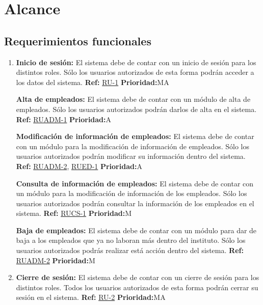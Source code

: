\section{Alcance}

\subsection{Requerimientos funcionales}

\begin{enumerate}[leftmargin=2.5cm ,label={\bfseries RF-\arabic*}]
  
    \item \textbf{Inicio de sesión:} El sistema debe de contar con un inicio de sesión para los distintos roles. Sólo los usuarios autorizados de esta forma podrán acceder a los datos del sistema.
    \textbf{Ref:} \hyperlink{ReqUsr:RU-1}{RU-1}
    \textbf{Prioridad:}MA

    \textbf{Alta de empleados:} El sistema debe de contar con un módulo de alta de empleados. Sólo los usuarios autorizados podrán darlos de alta en el sistema.
    \textbf{Ref:} \hyperlink{ReqUsr:RUADM-1}{RUADM-1}
    \textbf{Prioridad:}A

    \textbf{Modificación de información de empleados:} El sistema debe de contar con un módulo para la modificación de información de empleados. Sólo los usuarios autorizados podrán modificar su información dentro del sistema.
    \textbf{Ref:} \hyperlink{ReqUsr:RUADM-2}{RUADM-2}, \hyperlink{ReqUsr:RUED-1}{RUED-1}
    \textbf{Prioridad:}A
    
    \textbf{Consulta de información de empleados:} El sistema debe de contar con un módulo para la modificación de información de los empleados. Sólo los usuarios autorizados podrán consultar la información de los empleados en el sistema.
    \textbf{Ref:} \hyperlink{ReqUsr:RUCS-1}{RUCS-1}
    \textbf{Prioridad:}M
    
    \textbf{Baja de empleados:} El sistema debe de contar con un módulo para dar de baja a los empleados que ya no laboran más dentro del instituto. Sólo los usuarios autorizados podrás realizar está acción dentro del sistema.
    \textbf{Ref:} \hyperlink{ReqUsr:RUADM-2}{RUADM-2}
    \textbf{Prioridad:}M

    \item \textbf{Cierre de sesión:} El sistema debe de contar con un cierre de sesión para los distintos roles. Todos los usuarios autorizados de esta forma podrán cerrar su sesión en el sistema.
    \textbf{Ref:} \hyperlink{ReqUsr:RU-2}{RU-2}
    \textbf{Prioridad:}MA

\end{enumerate}